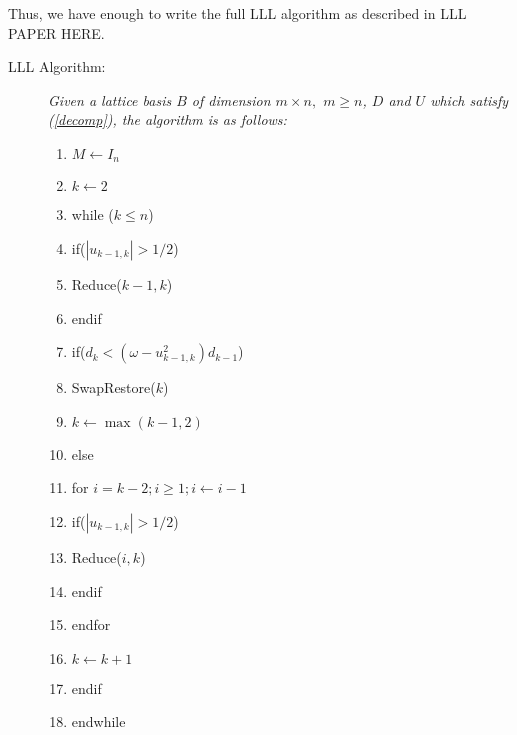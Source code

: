 \documentclass[12pt]{article}
\numberwithin{equation}{section}
\numberwithin{table}{section}
\numberwithin{figure}{section}
\begin{document}
Thus, we have enough to write the full LLL algorithm as described in LLL PAPER HERE.
\pagebreak
\begin{description}
\item[LLL Algorithm:] \textit{Given a lattice basis $B$ of dimension $m\times n,$ $m\geq n$, $D$ and $U$ which satisfy (\ref{decomp}), the algorithm is as follows:}
\begin{enumerate}
\item $M\leftarrow I_n$
\item $k\leftarrow 2$
\item while ($k\leq n$)
\item \hspace{2em} if($|u_{k-1,k}|>1/2$)
\item \hspace{2em}\hspace{2em} Reduce($k-1,k$)
\item \hspace{2em} endif
\item \hspace{2em} if($d_k<\left(\omega -u^2_{k-1,k}\right)d_{k-1}$)
\item \hspace{2em}\hspace{2em} SwapRestore($k$)
\item \hspace{2em}\hspace{2em} $k\leftarrow\max(k-1,2)$
\item \hspace{2em} else
\item \hspace{2em}\hspace{2em} for $i=k-2; i \geq 1; i\leftarrow i-1$
\item \hspace{2em}\hspace{2em} \hspace{2em} if($|u_{k-1,k}|>1/2$)
\item \hspace{2em}\hspace{2em} \hspace{2em} \hspace{2em} Reduce($i,k$)
\item \hspace{2em}\hspace{2em} \hspace{2em} endif
\item \hspace{2em}\hspace{2em} endfor
\item \hspace{2em} $k\leftarrow k+1$
\item \hspace{2em} endif
\item endwhile
\end{enumerate}
\end{description}
\end{document}
